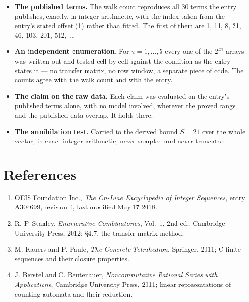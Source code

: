 \documentclass[11pt]{article}
\theoremstyle{definition}
\begin{document}
\begin{itemize}

\item {\bfseries The published terms.} The walk count reproduces all 30 terms the entry publishes, exactly, in integer arithmetic, with the index taken from the entry's stated offset (1) rather than fitted. The first of them are 1, 11, 8, 21, 46, 103, 201, 512,~\dots

\item {\bfseries An independent enumeration.} For $n = 1,\dots,5$ every one of the $2^{3n}$ arrays was written out and tested cell by cell against the condition as the entry states it --- no transfer matrix, no row window, a separate piece of code. The counts agree with the walk count and with the entry.

\item {\bfseries The claim on the raw data.} Each claim was evaluated on the entry's published terms alone, with no model involved, wherever the proved range and the published data overlap. It holds there.

\item {\bfseries The annihilation test.} Carried to the derived bound $S = 21$ over the whole vector, in exact integer arithmetic, never sampled and never truncated.

\end{itemize}

\section{References}

\begin{enumerate}

\item OEIS Foundation Inc., \emph{The On-Line Encyclopedia of Integer Sequences}, entry \href{https://oeis.org/A304699}{A304699}, revision 4, last modified May 17 2018.

\item R. P. Stanley, \emph{Enumerative Combinatorics}, Vol.~1, 2nd ed., Cambridge University Press, 2012; \S4.7, the transfer-matrix method.

\item M. Kauers and P. Paule, \emph{The Concrete Tetrahedron}, Springer, 2011; C-finite sequences and their closure properties.

\item J. Berstel and C. Reutenauer, \emph{Noncommutative Rational Series with Applications}, Cambridge University Press, 2011; linear representations of counting automata and their reduction.

\end{enumerate}
\end{document}

